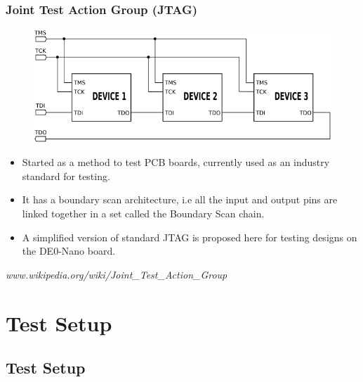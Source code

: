 \documentclass{beamer}
\begin{document}
\begin{frame}
\frametitle{Joint Test Action Group (JTAG)}

\begin{figure}[h!]
\centering
\includegraphics[scale=0.3]{jtagWiki.png}
\end{figure}

\begin{itemize}
\item Started as a method to test PCB boards, currently used as an industry standard for testing.
\item It has a boundary scan architecture, i.e all the input and output pins are linked together in a set called the Boundary Scan chain.
\item A simplified version of standard JTAG is proposed here for testing designs on the DE0-Nano board.
\end{itemize}

\begin{flushright}
\begin{scriptsize}
\textit{www.wikipedia.org/wiki/Joint\_Test\_Action\_Group}
\end{scriptsize}
\end{flushright}

\end{frame}

\section{Test Setup}
\subsection{Test Setup}
\end{document}
